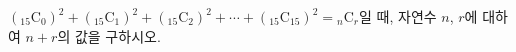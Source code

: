$({}_{15}\mathrm{C}_0)^2+({}_{15}\mathrm{C}_1)^2+({}_{15}\mathrm{C}_2)^2+\cdots+({}_{15}\mathrm{C}_{15})^2={}_n\mathrm{C}_r$일 때, 자연수 $n$, $r$에 대하여 $n+r$의 값을 구하시오.
